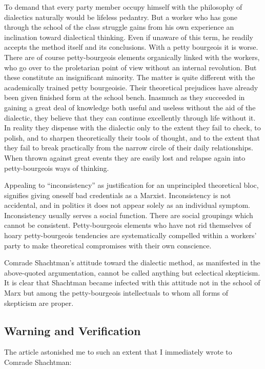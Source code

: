 To demand that every party member occupy himself with the philosophy of dialectics naturally would be lifeless pedantry. But a worker who has gone through the school of the class struggle gains from his own experience an inclination toward dialectical thinking. Even if unaware of this term, he readily accepts the method itself and its conclusions. With a petty bourgeois it is worse. There are of course petty-bourgeois elements organically linked with the workers, who go over to the proletarian point of view without an internal revolution. But these constitute an insignificant minority. The matter is quite different with the academically trained petty bourgeoisie. Their theoretical prejudices have already been given finished form at the school bench. Inasmuch as they succeeded in gaining a great deal of knowledge both useful and useless without the aid of the dialectic, they believe that they can continue excellently through life without it. In reality they dispense with the dialectic only to the extent they fail to check, to polish, and to sharpen theoretically their tools of thought, and to the extent that they fail to break practically from the narrow circle of their daily relationships. When thrown against great events they are easily lost and relapse again into petty-bourgeois ways of thinking.

Appealing to “inconsistency” as justification for an unprincipled theoretical bloc, signifies giving oneself bad credentials as a Marxist. Inconsistency is not accidental, and in politics it does not appear solely as an individual symptom. Inconsistency usually serves a social function. There are social groupings which cannot be consistent. Petty-bourgeois elements who have not rid themselves of hoary petty-bourgeois tendencies are systematically compelled within a workers’ party to make theoretical compromises with their own conscience.

Comrade Shachtman’s attitude toward the dialectic method, as manifested in the above-quoted argumentation, cannot be called anything but eclectical skepticism. It is clear that Shachtman became infected with this attitude not in the school of Marx but among the petty-bourgeois intellectuals to whom all forms of skepticism are proper.

\subsection*{Warning and Verification}

The article astonished me to such an extent that I immediately wrote to Comrade Shachtman:

